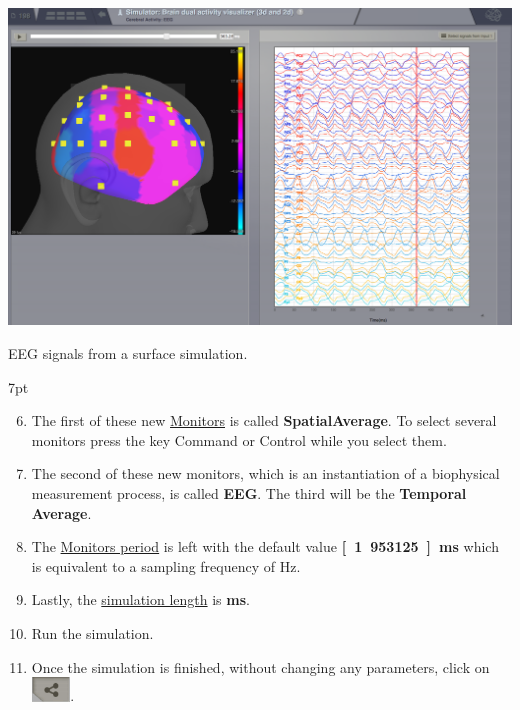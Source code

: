 \documentclass{tufte-handout}
\newenvironment{simulation}{%
  \def\FrameCommand{%
    \hspace{1pt}%
    {\color{ForestGreen}\vrule width 2pt}%
    {\color{simulationshade}\vrule width 4pt}%
    \colorbox{simulationshade}%
  }%
  \MakeFramed{\advance\hsize-\width\FrameRestore}%
  \noindent\hspace{-4.55pt}%
  \begin{adjustwidth}{}{7pt}%
  \vspace{2pt}\vspace{2pt}%
}
{%
  \vspace{2pt}\end{adjustwidth}\endMakeFramed%
}
\begin{document}
\begin{marginfigure}
  \includegraphics[width=\linewidth]{Handout_UI_BrainNetworkModelsAtRest_GaussianLocalConnectivityPotatoHead.png}%
  \caption{EEG signals from a surface simulation.}%
  \label{fig:potato_head}%
\end{marginfigure}

\begin{simulation}
\begin{enumerate}[resume]
\setcounter{enumi}{5}
\item The first of these new \underline{Monitors} is called
\textbf{{SpatialAverage}}. To select several monitors press the key Command or Control while you select them.
\item The second of these new monitors, which is an instantiation of a
biophysical measurement process, is called \textbf{EEG}. The third will be the \textbf{Temporal Average}.
\item The \underline{Monitors period} is left with the default value \textbf{\unit[1.953125]{ms}} which is equivalent to a sampling frequency of \unit[256]{Hz}.
\item Lastly, the \underline{simulation length} is \textbf{\unit[500]{ms}}.
\item Run the simulation.
\item Once the simulation is finished, without changing any parameters, click on \includegraphics[width=0.08\textwidth]{butt_branching}.

\end{enumerate}
\end{simulation}
\end{document}
